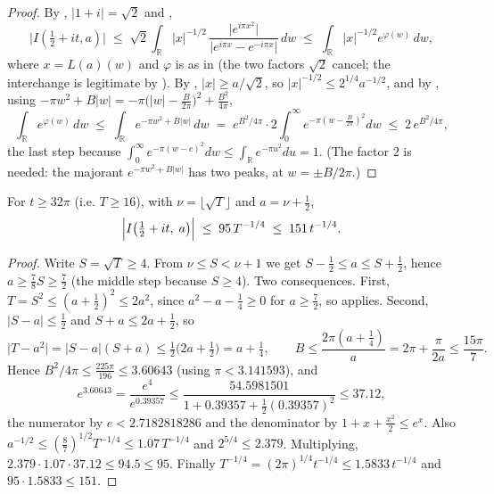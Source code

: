 \begin{proof}
\leanok
By , $\lvert 1+i\rvert=\sqrt2$ and ,
\[
  \bigl|I(\tfrac12+it,a)\bigr|
  \;\le\;\sqrt2\int_{\mathbb{R}}\lvert x\rvert^{-1/2}\,
     \frac{\bigl|e^{i\pi x^{2}}\bigr|}{\lvert e^{i\pi x}-e^{-i\pi x}\rvert}\,dw
  \;\le\;\int_{\mathbb{R}}\lvert x\rvert^{-1/2}e^{\varphi(w)}\,dw ,
\]
where $x=L(a)(w)$ and $\varphi$ is as in  (the two factors
$\sqrt2$ cancel; the interchange is legitimate by ).  By
,
$\lvert x\rvert\ge a/\sqrt2$, so $\lvert x\rvert^{-1/2}\le2^{1/4}a^{-1/2}$, and by
, using
$-\pi w^{2}+B\lvert w\rvert=-\pi\bigl(\lvert w\rvert-\tfrac B{2\pi}\bigr)^{2}+\tfrac{B^{2}}{4\pi}$,
\[
  \int_{\mathbb{R}}e^{\varphi(w)}\,dw\;\le\;\int_{\mathbb{R}}e^{-\pi w^{2}+B|w|}\,dw
  \;=\;e^{B^{2}/4\pi}\cdot2\int_{0}^{\infty}e^{-\pi\left(w-\frac{B}{2\pi}\right)^{2}}dw
  \;\le\;2\,e^{B^{2}/4\pi},
\]
the last step because $\int_{0}^{\infty}e^{-\pi(w-c)^{2}}dw\le\int_{\mathbb{R}}e^{-\pi u^{2}}du=1$.
(The factor $2$ is needed: the majorant $e^{-\pi w^{2}+B|w|}$ has two peaks, at
$w=\pm B/2\pi$.)
\end{proof}

\begin{corollary}
\label{cor:rs_remainder_explicit}
\leanok
{}
For $t\ge32\pi$ (i.e. $T\ge16$), with $\nu=\lfloor\sqrt T\rfloor$ and $a=\nu+\tfrac12$,
\[
  \Bigl|I\bigl(\tfrac12+it,\;a\bigr)\Bigr|
  \;\le\;95\,T^{-1/4}\;\le\;151\,t^{-1/4}.
\]
\end{corollary}

\begin{proof}
\leanok
Write $S=\sqrt T\ge4$.  From $\nu\le S<\nu+1$ we get $S-\tfrac12\le a\le S+\tfrac12$, hence
$a\ge\tfrac78 S\ge\tfrac72$ (the middle step because $S\ge4$).  Two consequences.  First,
$T=S^{2}\le(a+\tfrac12)^{2}\le2a^{2}$, since $a^{2}-a-\tfrac14\ge0$ for $a\ge\tfrac72$, so
 applies.  Second, $\lvert S-a\rvert\le\tfrac12$ and
$S+a\le2a+\tfrac12$, so
\[
  \lvert T-a^{2}\rvert=\lvert S-a\rvert(S+a)\le\tfrac12\bigl(2a+\tfrac12\bigr)=a+\tfrac14,
  \qquad B\le\frac{2\pi(a+\tfrac14)}{a}=2\pi+\frac{\pi}{2a}\le\frac{15\pi}7 .
\]
Hence $B^{2}/4\pi\le\tfrac{225\pi}{196}\le3.60643$ (using $\pi<3.141593$), and
\[
  e^{3.60643}=\frac{e^{4}}{e^{0.39357}}
  \le\frac{54.5981501}{1+0.39357+\tfrac12(0.39357)^{2}}\le37.12 ,
\]
the numerator by $e<2.7182818286$ and the denominator by $1+x+\tfrac{x^{2}}2\le e^{x}$.  Also
$a^{-1/2}\le(\tfrac87)^{1/2}T^{-1/4}\le1.07\,T^{-1/4}$ and $2^{5/4}\le2.379$.  Multiplying,
$2.379\cdot1.07\cdot37.12\le94.5\le95$.  Finally
$T^{-1/4}=(2\pi)^{1/4}t^{-1/4}\le1.5833\,t^{-1/4}$ and $95\cdot1.5833\le151$.
\end{proof}

